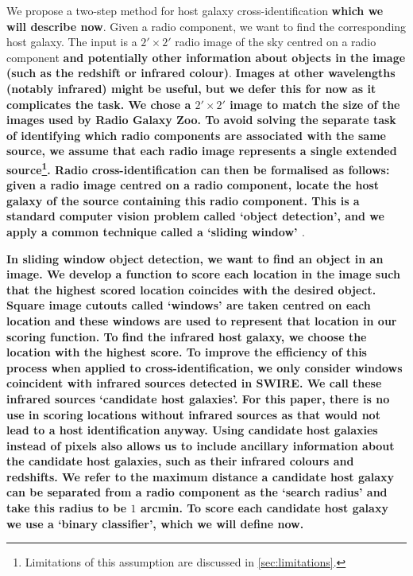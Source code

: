 \documentclass[fleqn,usenatbib,usedcolumn]{mnras}
\newcommand{\edited}[1]{{\bf {#1}}}
\begin{document}
    We propose a two-step method for host galaxy cross-identification
    \edited{which we will describe now}. Given a radio component, we want to find
    the corresponding host galaxy. The input is a $2' \times
    2'$ radio image of
    the sky centred on a radio component \edited{and potentially other information about
    objects in the image (such as the redshift or infrared colour)}. \edited{Images at other wavelengths (notably infrared) might be
    useful, but we defer this for now as it complicates the task.
    \edited{We chose a $2' \times 2'$ image to match} the size of the images used
    by Radio Galaxy Zoo. To avoid solving the separate task of identifying
    which radio components are associated with the same source, we assume
    that each radio image represents a single extended
    source\footnote{Limitations of this assumption are discussed in
    \autoref{sec:limitations}.}. Radio cross-identification can then
    be formalised as follows: given a radio image centred on a radio
    component, locate the host galaxy of the source containing this radio
    component. This is a standard computer vision problem called `object
    detection', and we apply a common technique called a `sliding window'
    \citep{rowley1996facedetection}}.

    \edited{In sliding window object detection, we want to find an object in an image.
    We develop a function to score each location in the image such that the
    highest scored location coincides with the desired object. Square image
    cutouts called `windows' are taken centred on each location and these
    windows are used to represent that location in our scoring function. To
    find the infrared host galaxy, we choose the location with the highest
    score. To improve the efficiency of this process when applied to
    cross-identification, we only consider windows coincident with infrared
    sources detected in SWIRE. We call these infrared sources `candidate
    host galaxies'. For this paper, there is no use in scoring
    locations without infrared sources as that would not lead to a host identification
    anyway. Using candidate host galaxies instead of pixels also
    allows us to include ancillary information about the candidate host
    galaxies, such as their infrared colours and redshifts. We refer to the
    maximum distance a candidate host galaxy can be separated from a radio component as
    the `search radius' and take this radius to be $1$ arcmin. To score each
    candidate host galaxy we use a `binary classifier', which we will define
    now.}
\end{document}
